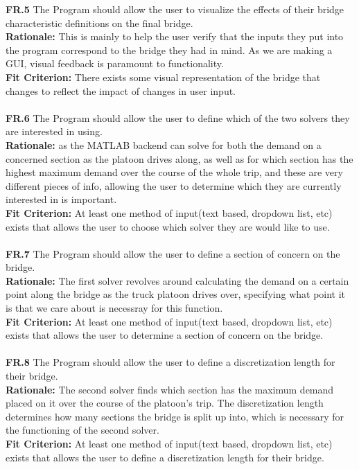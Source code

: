 \documentclass[12pt]{article}
\begin{document}
  \textbf{FR.5} The Program should allow the user to visualize the effects of their bridge characteristic definitions on the final bridge.\\
  \textbf{Rationale:} This is mainly to help the user verify that the inputs they put into the program correspond to the bridge they had in mind. As we are making a GUI,
  visual feedback is paramount to functionality.\\
  \textbf{Fit Criterion:} There exists some visual representation of the bridge that changes to reflect the impact of changes in user input.\\\\ 

  \textbf{FR.6} The Program should allow the user to define which of the two solvers they are interested in using.\\
  \textbf{Rationale:} as the MATLAB backend can solve for both the demand on a concerned section as the platoon drives along, as well as for which section has the 
  highest maximum demand over the course of the whole trip, and these are very different pieces of info, allowing the user to determine which they are currently interested in 
  is important.\\
  \textbf{Fit Criterion:} At least one method of input(text based, dropdown list, etc) exists that allows the user to choose which solver they are would like to use.\\\\

  \textbf{FR.7} The Program should allow the user to define a section of concern on the bridge.\\
  \textbf{Rationale:} The first solver revolves around calculating the demand on a certain point along the bridge as the truck platoon drives over, specifying what point it is
  that we care about is necessray for this function.\\
  \textbf{Fit Criterion:} At least one method of input(text based, dropdown list, etc) exists that allows the user to determine a section of concern on the bridge.\\\\

  \textbf{FR.8} The Program should allow the user to define a discretization length for their bridge.\\
  \textbf{Rationale:} The second solver finds which section has the maximum demand placed on it over the course of the platoon's trip. The discretization length determines how
  many sections the bridge is split up into, which is necessary for the functioning of the second solver.\\
  \textbf{Fit Criterion:} At least one method of input(text based, dropdown list, etc) exists that allows the user to define a discretization length for their bridge.\\\\
\end{document}
